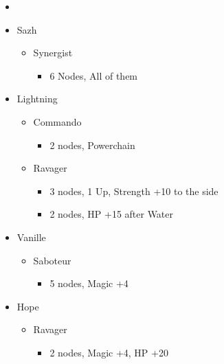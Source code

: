 \begin{menu}
\begin{multicols}{2}
\begin{itemize}
    \paradigm
    \begin{itemize}
        \item {}%
{\paradigmline{\rav}{\com}{\rav}}%
{\paradigmline{\syn}{\com}{\sab}}%
{\paradigmline{\rav}{\com}{(\rav)}}%
{\paradigmline[4]{\textit{\rav}}{\textit{\rav}}{\textit{\sab}}}%
{\paradigmline{\rav}{[\rav]}{\rav}}%
{\paradigmline{[\syn]}{[\rav]}{\rav}}
    \end{itemize}
    \columnbreak
    \crystarium
    \begin{itemize}
        \item Sazh
        \begin{itemize}
            \item Synergist
            \begin{itemize}
                \item 6 Nodes, All of them
            \end{itemize}
        \end{itemize}
        \item Lightning
        \begin{itemize}
            \item Commando
            \begin{itemize}
                \item 2 nodes, Powerchain
            \end{itemize}
            \item Ravager
            \begin{itemize}
                \item 3 nodes, 1 Up, Strength +10 to the side
                \item 2 nodes, HP +15 after Water
            \end{itemize}
        \end{itemize}
        \item Vanille
        \begin{itemize}
            \item Saboteur
            \begin{itemize}
                \item 5 nodes, Magic +4
            \end{itemize}
        \end{itemize}
        \item Hope
        \begin{itemize}
            \item Ravager
            \begin{itemize}
                \item 2 nodes, Magic +4, HP +20
            \end{itemize}
        \end{itemize}
    \end{itemize}
\end{itemize}
\end{multicols}
\end{menu}

